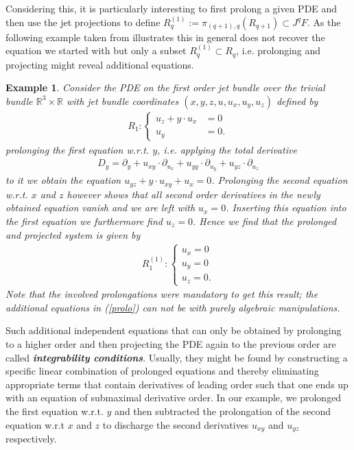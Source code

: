\documentclass[a4paper,12pt, DIV=14, BCOR=5mm, twoside, headsepline, numbers=noenddot]{scrbook}
\newtheorem{example}{Example}[chapter]
\begin{document}
Considering this, it is particularly interesting to first prolong a given PDE and then use the jet projections to define $R_q^{(1)} := \pi_{(q+1),q}\left ( R_{q+1} \right ) \subset J^qF $. As the following example taken from \cite{seiler1994analysis} illustrates this in general does not recover the equation we started with but only a subset $R_q^{(1)} \subset R_q$, i.e. prolonging and projecting might reveal additional equations.
\begin{example}
Consider the PDE on the first order jet bundle over the trivial bundle $\mathbb{R}^3 \times \mathbb{R}$ with jet bundle  coordinates $(x,y,z,u,u_x,u_y,u_z)$ defined by 
\begin{align}
    R_1 : \begin{cases} u_z + y \cdot u_x &= 0 \\
                        u_y &= 0.
            \end{cases}
\end{align}
prolonging the first equation w.r.t. $y$, i.e. applying the total derivative 
\begin{align}
D_y = \partial_y + u_{xy} \cdot \partial_{u_x} + u_{yy} \cdot \partial_{u_y} + u_{yz} \cdot \partial_{u_z}
\end{align}
to it we obtain the equation $u_{yz} + y \cdot u_{xy} + u_x =0$. Prolonging the second equation w.r.t. $x$ and $z$ however shows that all second order derivatives in the newly obtained equation vanish and we are left with $u_x = 0$. Inserting this equation into the first equation we furthermore find $u_z = 0$. Hence we find that the prolonged and projected system is given by 
\begin{align}\label{prolo}
    R_1^{(1)} : \begin{cases} u_x = 0 \\
                        u_y = 0\\
                        u_z = 0 .
            \end{cases}
\end{align}
Note that the involved prolongations were mandatory to get this result; the additional equations in (\ref{prolo})  can not be with purely algebraic manipulations. 
\end{example}
Such additional independent equations that can only be obtained by prolonging to a higher order and then projecting the PDE again to the previous order are called \textit{\textbf{integrability conditions}}. 
Usually, they might be found by constructing a specific linear combination of prolonged equations and thereby eliminating appropriate terms that contain derivatives of leading order such that one ends up with an equation of submaximal derivative order. In our example, we prolonged the first equation w.r.t. $y$ and then subtracted the prolongation of the second equation w.r.t $x$ and $z$ to discharge the second derivatives $u_{xy}$ and $u_{yz}$ respectively. 
\end{document}
